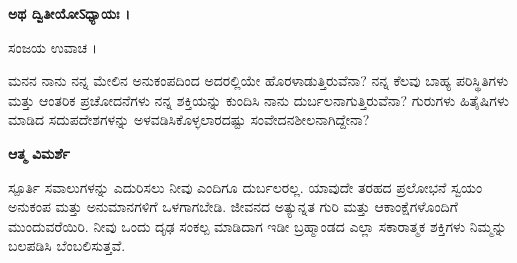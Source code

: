 \centerline{\textbf{ಅಥ ದ್ವಿತೀಯೋऽಧ್ಯಾಯಃ ।}\\}
ಸಂಜಯ ಉವಾಚ ।\\

\newpage
\begin{mananam}{\kanfont ಮನನ}
\footnotesize \mananamfont ನಾನು ನನ್ನ ಮೇಲಿನ ಅನುಕಂಪದಿಂದ ಅದರಲ್ಲಿಯೇ ಹೊರಳಾಡುತ್ತಿರುವೆನಾ? ನನ್ನ ಕೆಲವು ಬಾಹ್ಯ ಪರಿಸ್ಥಿತಿಗಳು ಮತ್ತು ಆಂತರಿಕ ಪ್ರಚೋದನೆಗಳು ನನ್ನ ಶಕ್ತಿಯನ್ನು ಕುಂದಿಸಿ ನಾನು ದುರ್ಬಲನಾಗುತ್ತಿರುವೆನಾ? ಗುರುಗಳು ಹಿತೈಷಿಗಳು ಮಾಡಿದ ಸದುಪದೇಶಗಳನ್ನು ಅಳವಡಿಸಿಕೊಳ್ಳಲಾರದಷ್ಟು ಸಂವೇದನಶೀಲನಾಗಿದ್ದೇನಾ?
\end{mananam}
\WritingHand\enspace\textbf{ಆತ್ಮ ವಿಮರ್ಶೆ}
\begin{inspiration}{\kanfont ಸ್ಪೂರ್ತಿ}
\footnotesize \mananamfont ಸವಾಲುಗಳನ್ನು ಎದುರಿಸಲು ನೀವು ಎಂದಿಗೂ ದುರ್ಬಲರಲ್ಲ. ಯಾವುದೇ ತರಹದ ಪ್ರಲೋಭನೆ ಸ್ವಯಂ ಅನುಕಂಪ ಮತ್ತು ಅನುಮಾನಗಳಿಗೆ ಒಳಗಾಗಬೇಡಿ. ಜೀವನದ ಅತ್ಯುನ್ನತ ಗುರಿ ಮತ್ತು ಆಕಾಂಕ್ಷೆಗಳೊಂದಿಗೆ ಮುಂದುವರೆಯಿರಿ. ನೀವು ಒಂದು ದೃಢ ಸಂಕಲ್ಪ ಮಾಡಿದಾಗ ಇಡೀ ಬ್ರಹ್ಮಾಂಡದ ಎಲ್ಲಾ ಸಕಾರಾತ್ಮಕ ಶಕ್ತಿಗಳು ನಿಮ್ಮನ್ನು ಬಲಪಡಿಸಿ ಬೆಂಬಲಿಸುತ್ತವೆ.
\end{inspiration}
\newpage

